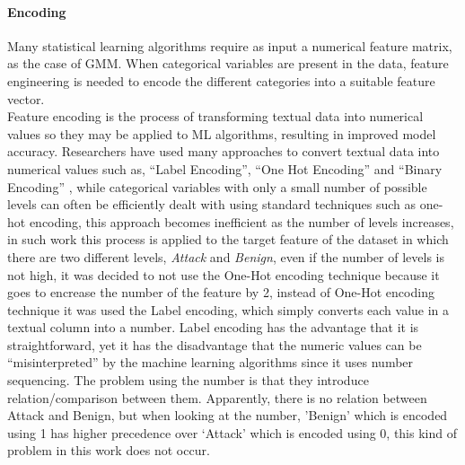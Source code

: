 \documentclass[runningheads]{llncs}
\begin{document}
\paragraph{Encoding}
Many statistical learning algorithms require as input a numerical feature matrix, as the case of GMM. When categorical variables are present in the data, feature engineering is needed to encode the different categories into a suitable feature vector.\\
Feature encoding is the process of transforming textual data into numerical values so they may be applied to ML algorithms, resulting in improved model accuracy. Researchers have used many approaches to convert textual data into numerical values such as, “Label Encoding”, “One Hot Encoding” and “Binary Encoding” \cite{ref_paper8}, while categorical variables with only a small number of possible levels can often be efficiently dealt with using standard techniques such as one-hot encoding, this approach becomes inefficient as the number of levels increases, in such work this process is applied to the target feature of the dataset in which there are two different levels, \textit{Attack} and \textit{Benign}, even if the number of levels is not high, it was decided to not use the One-Hot encoding technique because it goes to encrease the number of the feature by 2, instead of One-Hot encoding technique it was used the Label encoding, which simply converts each value in a textual column into a number. Label encoding has the advantage that it is straightforward, yet it has the disadvantage that the numeric values can be “misinterpreted” by the machine learning algorithms since it uses number sequencing. The problem using the number is that they introduce relation/comparison between them. Apparently, there is no relation between Attack and Benign, but when looking at the number, 'Benign' which is encoded using 1 has higher precedence over ‘Attack’ which is encoded using 0, this kind of problem in this work does not occur.
\end{document}
